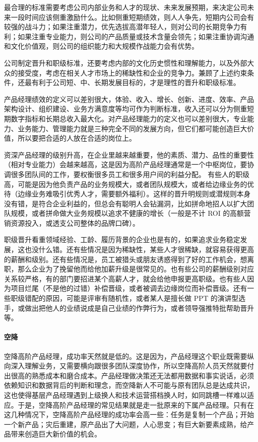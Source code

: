 \documentclass[letterpaper,11pt,english]{sphinxmanual}
\begin{document}
最合理的标准需要考虑公司内部业务和人才的现状、未来发展预期，来决定公司未来一段时间应该侧重激励什么。比如侧重短期绩效，则人人争先，短期内公司会有较强的战斗力；如果注重潜力，优先选拔高潜年轻人，则对公司的长期竞争力有利；如果注重专业能力，则公司的产品质量或技术含量会领先；如果注重协调沟通和文化价值观，则公司的组织能力和大规模作战能力会有优势。

公司制定晋升和职级标准，还要考虑内部的文化历史惯性和理解能力，以及外部大众的接受度，考虑在相关人才市场上的稀缺性和企业的竞争力。兼顾了上述约束条件，还最有利于公司短、中、长期发展目标的，才是理性的晋升和职级标准。

产品经理绩效的定义可以差别很大，体验、收入、增长、创新、进度、效率、产品架构设计、组织建设、业务方满意度等均可作为判断标准，收入还可以分为侧重短期数字指标和长期总收入最大化。对产品经理能力的定义也可以差别很大，专业能力、业务能力、管理能力就是三种完全不同的发展方向，但它们都可能创造巨大价值，所以要把合适的人放在合适的岗位上。

资深产品经理的级别升高，在企业里越来越重要，他的素质、潜力、品性的重要性（相对专业能力）会越来越高，这是因为高阶产品经理通常是一个中枢岗位，要协调很多团队间的工作，要权衡很多员工和很多用户间的利益分配。
有些人的职级高，可能是因为他负责产品的业务规模大，或者团队规模大，或者给边缘业务的优待（边缘业务难吸引优秀人才，需要额外福利）。这样的晋升明规则或潜规则本身没有错，是符合企业利益的，但总会有聪明人会钻漏洞，比如拼命地招人以扩大团队规模，或者拼命做大业务规模以追求不健康的增长（一般是不计
ROI 的高额营销资源投入，或透支公司整体的品牌口碑）。

职级晋升看重领域经验、工龄、履历背景的企业也是有的，如果追求业务稳定发展，这也没什么错。还有些情况是因为稀缺性，某些人才很稀缺，就容易获得更高的薪酬和级别。还有些情况是，员工被猎头或朋友诱惑得到了好的工作机会，想离职，那么企业为了挽留他而给他加薪升级是很常见的。也有些公司的薪酬级别对应关系较严格，有的部门要招进某个高薪人才，就会给他申报更高职级。也有些人因为项目烂尾（不是他的过错）补偿晋级，或者被调去边缘岗位而补偿晋级。还有一些职级错配的原因，可能是评审有随机性，或者某人是擅长做
PPT
的演讲型选手，或做出把他人的业绩说成是自己业绩的作弊行为，或者领导强推特批帮助晋升等。


\paragraph{空降}
\label{\detokenize{chapter_experience/career_path:id12}}
空降高阶产品经理，成功率天然就是低的。这是因为，产品经理这个职业既需要纵向深入理解业务，又需要横向跟很多团队深度协作，所以空降高阶人员天然就要付出很高的熟悉成本和磨合成本。产品经理做决策还无法都用数据和事实说话，必须依赖知识和数据背后的判断和理念，而空降新人不可能与原有团队总是达成共识，这也使得基层产品经理遇到上级换人和技术运营搭档换人时，如同跳槽一样难以适应。于是，空降高阶产品经理的常见结果就是走一批原来的下属产品经理。只有在这几种情况下，空降高阶产品经理的成功率会高一些：任务是复制一个产品；开始一个新产品；灾后重建，原产品出了大问题，人心思变；有巨大新要素成熟，给产品带来创造巨大新价值的机会。
\end{document}
